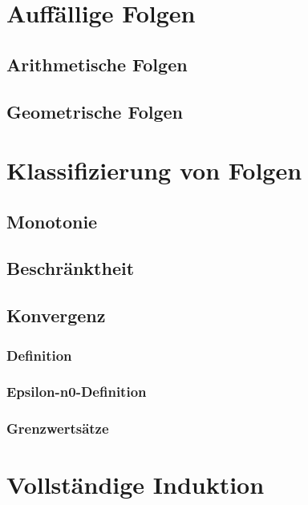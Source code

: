 		\section{Auffällige Folgen}


	\subsection{Arithmetische Folgen}

	\subsection{Geometrische Folgen}


		\section{Klassifizierung von Folgen}


	\subsection{Monotonie}

	\subsection{Beschränktheit}

	\subsection{Konvergenz}

\subsubsection{Definition}
\subsubsection{Epsilon-n0-Definition}
\subsubsection{Grenzwertsätze}


		\section{Vollständige Induktion}
